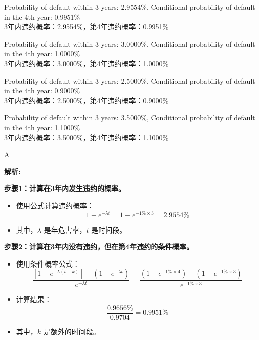 \documentclass{article}
\newenvironment{explanation}
{\textbf{解析:}\par}
{\par}
\begin{document}
\begin{choices}
    \item Probability of default within 3 years: 2.9554\%, Conditional probability of default in the 4th year: 0.9951\% \\
    3年内违约概率：2.9554\%，第4年违约概率：0.9951\%
    \item Probability of default within 3 years: 3.0000\%, Conditional probability of default in the 4th year: 1.0000\% \\
    3年内违约概率：3.0000\%，第4年违约概率：1.0000\%
    \item Probability of default within 3 years: 2.5000\%, Conditional probability of default in the 4th year: 0.9000\% \\
    3年内违约概率：2.5000\%，第4年违约概率：0.9000\%
    \item Probability of default within 3 years: 3.5000\%, Conditional probability of default in the 4th year: 1.1000\% \\
    3年内违约概率：3.5000\%，第4年违约概率：1.1000\%
\end{choices}

\begin{correctanswer}
    A
\end{correctanswer}


\begin{explanation}
    \textbf{步骤1：计算在3年内发生违约的概率。}
    \begin{itemize}
        \item 使用公式计算违约概率：
        \[
        1 - e^{-\lambda t} = 1 - e^{-1\% \times 3} = 2.9554\%
        \]
        \item 其中，\(\lambda\) 是年危害率，\(t\) 是时间段。
    \end{itemize}

    \textbf{步骤2：计算在3年内没有违约，但在第4年违约的条件概率。}
    \begin{itemize}
        \item 使用条件概率公式：
        \[
        \frac{\left[1 - e^{-\lambda (t+k)}\right] - \left(1 - e^{-\lambda t}\right)}{e^{-\lambda t}} = \frac{\left(1 - e^{-1\% \times 4}\right) - \left(1 - e^{-1\% \times 3}\right)}{e^{-1\% \times 3}}
        \]
        \item 计算结果：
        \[
        \frac{0.9656\%}{0.9704} = 0.9951\%
        \]
        \item 其中，\(k\) 是额外的时间段。
    \end{itemize}
\end{explanation}
\end{document}
